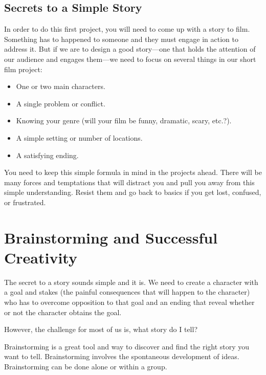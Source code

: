 \documentclass[
]{book}
\providecommand{\tightlist}{%
  \setlength{\itemsep}{0pt}\setlength{\parskip}{0pt}}
\begin{document}
\hypertarget{secrets-to-a-simple-story}{%
\subsection*{Secrets to a Simple Story}\label{secrets-to-a-simple-story}}

In order to do this first project, you will need to come up with a story to film. Something has to happened to someone and they must engage in action to address it. But if we are to design a good story---one that holds the attention of our audience and engages them---we need to focus on several things in our short film project:

\begin{itemize}
\tightlist
\item
  One or two main characters.\\
\item
  A single problem or conflict.\\
\item
  Knowing your genre (will your film be funny, dramatic, scary, etc.?).\\
\item
  A simple setting or number of locations.\\
\item
  A satisfying ending.
\end{itemize}

You need to keep this simple formula in mind in the projects ahead. There will be many forces and temptations that will distract you and pull you away from this simple understanding. Resist them and go back to basics if you get lost, confused, or frustrated.

\hypertarget{brainstorming-and-successful-creativity}{%
\section{Brainstorming and Successful Creativity}\label{brainstorming-and-successful-creativity}}

The secret to a story sounds simple and it is. We need to create a character with a goal and stakes (the painful consequences that will happen to the character) who has to overcome opposition to that goal and an ending that reveal whether or not the character obtains the goal.

However, the challenge for most of us is, what story do I tell?

Brainstorming is a great tool and way to discover and find the right story you want to tell. Brainstorming involves the spontaneous development of ideas. Brainstorming can be done alone or within a group.
\end{document}
